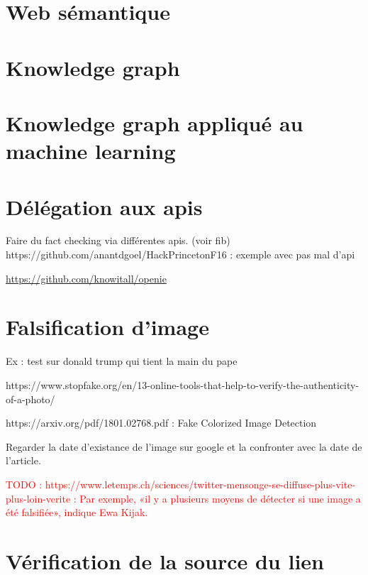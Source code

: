 \documentclass[12pt]{article}
\newcommand\todo[1]{\textcolor{red}{TODO : #1}}
\begin{document}


\section{Web sémantique}



\section{Knowledge graph}
\label{section_knowledge_graph}



\section{Knowledge graph appliqué au machine learning}



\section{Délégation aux apis}

Faire du fact checking via différentes apis. (voir fib)
https://github.com/anantdgoel/HackPrincetonF16 : exemple avec pas mal d'api

\url{https://github.com/knowitall/openie}

\section{Falsification d'image}

Ex : test sur donald trump qui tient la main du pape

https://www.stopfake.org/en/13-online-tools-that-help-to-verify-the-authenticity-of-a-photo/

https://arxiv.org/pdf/1801.02768.pdf : Fake Colorized Image Detection

Regarder la date d'existance de l'image sur google et la confronter avec la date de l'article.

\todo{https://www.letemps.ch/sciences/twitter-mensonge-se-diffuse-plus-vite-plus-loin-verite : Par exemple, «il y a plusieurs moyens de détecter si une image a été falsifiée», indique Ewa Kijak.}


\section{Vérification de la source du lien}
\end{document}
